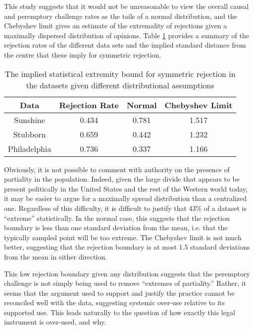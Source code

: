 This study suggests that it would not be unreasonable to view the overall causal and peremptory challenge rates as the tails of a
normal distribution, and the Chebyshev limit gives an estimate of the extremality of rejections given a maximally dispersed
distribution of opinions. Table \ref{tab:rejbounds} provides a summary of the rejection rates of the different data sets and the
implied standard distance from the centre that these imply for symmetric rejection.

\begin{table}
  \centering
  \caption[Implied Rejection Boundaries]{The implied statistical extremity bound for symmetric rejection in the datasets given
    different distributional assumptions} \label{tab:rejbounds}
  \begin{tabular}{|c|c|c|c|} \hline
    Data & Rejection Rate & Normal & Chebyshev Limit \\ \hline
    Sunshine & 0.434 & 0.781 & 1.517 \\
    Stubborn & 0.659 & 0.442 & 1.232 \\
    Philadelphia & 0.736 & 0.337 & 1.166 \\
    \hline
  \end{tabular}
\end{table}

Obviously, it is not possible to comment with authority on the presence of partiality in the population. Indeed, given the large
divide that appears to be present politically in the United States and the rest of the Western world today, it may be easier to
argue for a maximally spread distribution than a centralized one. Regardless of this difficulty, it is difficult to justify that
43\% of a dataset is ``extreme'' statistically. In the normal case, this suggests that the rejection boundary is less than one
standard deviation from the mean, i.e. that the typically sampled point will be too extreme. The Chebyshev limit is not much
better, suggesting that the rejection boundary is at most 1.5 standard deviations from the mean in either direction.

This low rejection boundary given any distribution suggests that the peremptory challenge is not simply being used to remove
``extremes of partiality.'' Rather, it seems that the argument used to support and justify the practice cannot be reconciled well
with the data, suggesting systemic over-use relative to its supported use. This leads naturally to the question of how exactly
this legal instrument is over-used, and why.

